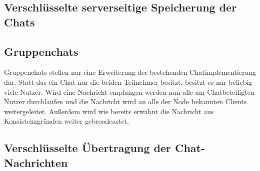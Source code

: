 
\subsection{Verschlüsselte serverseitige Speicherung der Chats}

\subsection{Gruppenchats}
Gruppenchats stellen nur eine Erweiterung der bestehenden Chatimplementierung dar. Statt das ein Chat nur die beiden Teilnehmer besitzt, besitzt es nur beliebig viele Nutzer. Wird eine Nachricht empfangen werden nun alle am Chatbeteiligten Nutzer durchlaufen und die Nachricht wird an alle der Node bekannten Clients weitergeleitet. Außerdem wird wie bereits erwähnt die Nachricht aus Konsistenzgründen weiter gebroadcastet.

\subsection{Verschlüsselte Übertragung der Chat-Nachrichten}


